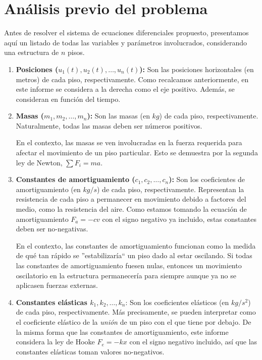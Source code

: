 \section{Análisis previo del problema}

Antes de resolver el sistema de ecuaciones diferenciales propuesto, presentamos aquí un listado de todas las variables y parámetros involucrados, considerando una estructura de \(n\) pisos.

\begin{enumerate}
    \item \textbf{Posiciones (\(u_1(t), u_2(t), \ldots, u_n(t)\)):} Son las posiciones horizontales (en metros) de cada piso, respectivamente. Como recalcamos anteriormente, en este informe se considera a la derecha como el eje positivo. Además, se consideran en función del tiempo.

    \item \textbf{Masas (\(m_1, m_2, \ldots, m_n\)):} Son las masas (en \(\si{kg}\)) de cada piso, respectivamente. Naturalmente, todas las masas deben ser números positivos.

        En el contexto, las masas se ven involucradas en la fuerza requerida para afectar el movimiento de un piso particular. Esto se demuestra por la segunda ley de Newton, \(\sum F_i = ma\).

    \item \textbf{Constantes de amortiguamiento (\(c_1, c_2, \ldots, c_n\)):} Son los coeficientes de amortiguamiento (en \(kg/s\)) de cada piso, respectivamente. Representan la resistencia de cada piso a permanecer en movimiento debido a factores del medio, como la resistencia del aire. Como estamos tomando la ecuación de amortiguamiento \(F_a = -cv\) con el signo negativo ya incluido, estas constantes deben ser no-negativas.

        En el contexto, las constantes de amortiguamiento funcionan como la medida de qué tan rápido se ''estabilizaría`` un piso dado al estar oscilando. Si todas las constantes de amortiguamiento fuesen nulas, entonces un movimiento oscilatorio en la estructura permanecería para siempre aunque ya no se aplicasen fuerzas externas.

    \item \textbf{Constantes elásticas \(k_1, k_2, \ldots, k_n\)}: Son los coeficientes elásticos (en \(\si{kg/s^2}\)) de cada piso, respectivamente. Más precisamente, se pueden interpretar como el coeficiente elástico de la \textit{unión} de un piso con el que tiene por debajo. De la misma forma que las constantes de amortiguamiento, este informe considera la ley de Hooke \(F_e = -kx\) con el signo negativo incluido, así que las constantes elásticas toman valores no-negativos.


\end{enumerate}
